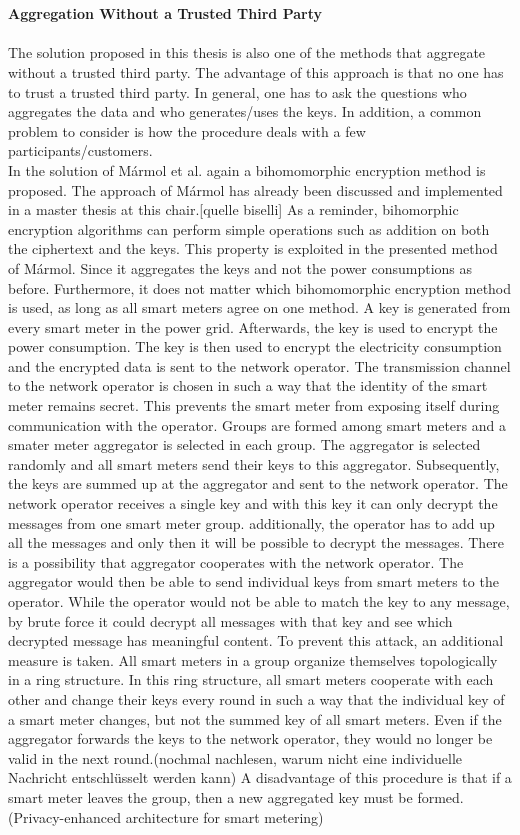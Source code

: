\\
\\
\textbf{Aggregation Without a Trusted Third Party}
\\
\\
The solution proposed in this thesis is also one of the methods that aggregate without a trusted third party. The advantage of this approach is that no one has to trust a trusted third party. In general, one has to ask the questions who aggregates the data and who generates/uses the keys. In addition, a common problem to consider is how the procedure deals with a few participants/customers. \\
In the solution of Mármol et al. again a bihomomorphic encryption method is proposed. The approach of Mármol has already been discussed and implemented in a master thesis at this chair.[quelle biselli] As a reminder, bihomorphic encryption algorithms can perform simple operations such as addition on both the ciphertext and the keys. This property is exploited in the presented method of Mármol. Since it aggregates the keys and not the power consumptions as before. Furthermore, it does not matter which bihomomorphic encryption method is used, as long as all smart meters agree on one method. A key is generated from every smart meter in the power grid. Afterwards, the key is used to encrypt the power consumption. The key is then used to encrypt the electricity consumption and the encrypted data is sent to the network operator. The transmission channel to the network operator is chosen in such a way that the identity of the smart meter remains secret.  This prevents the smart meter from exposing itself during communication with the operator. Groups are formed among smart meters and a smater meter aggregator is selected in each group. The aggregator is selected randomly and all smart meters send their keys to this aggregator. Subsequently, the keys are summed up at the aggregator and sent to the network operator. The network operator receives a single key and with this key it can only decrypt the messages from one smart meter group. additionally, the operator has to add up all the messages and only then it will be possible to decrypt the messages. There is a possibility that aggregator cooperates with the network operator. The aggregator would then be able to send individual keys from smart meters to the operator. While the operator would not be able to match the key to any message, by brute force it could decrypt all messages with that key and see which decrypted message has meaningful content. To prevent this attack, an additional measure is taken. All smart meters in a group organize themselves topologically in a ring structure. In this ring structure, all smart meters cooperate with each other and change their keys every round in such a way that the individual key of a smart meter changes, but not the summed key of all smart meters. Even if the aggregator forwards the keys to the network operator, they would no longer be valid in the next round.(nochmal nachlesen, warum nicht eine individuelle Nachricht entschlüsselt werden kann) A disadvantage of this procedure is that if a smart meter leaves the group, then a new aggregated key must be formed.(Privacy-enhanced architecture for smart metering)\\

